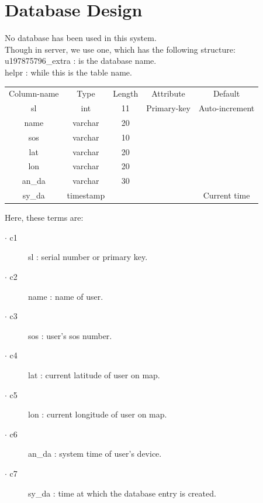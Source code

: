 \newpage
\section{Database Design}
\label{sec:sec02}

No database has been used in this system.\\
Though in server, we use one, which has the following structure: \\
u197875796\_extra : is the database name.\\
helpr : while this is the table name.\\


\begin{center}
\begin{tabular}{ c c c c c }
  
Column-name & Type & Length & Attribute & Default\\
sl & int & 11 & Primary-key & Auto-increment\\
name & varchar & 20\\
sos & varchar & 10\\
lat & varchar & 20\\
lon & varchar & 20\\
an\_da & varchar & 30 \\
sy\_da & timestamp & & & Current time\\
\end{tabular}
\end{center}
\vspace{0.6cm}
Here, these terms are:
\begin{description}
\item[$\cdot$ c1] sl : serial number or primary key.
\item[$\cdot$ c2] name : name of user.
\item[$\cdot$ c3] sos : user's sos number.
\item[$\cdot$ c4] lat : current latitude of user on map.
\item[$\cdot$ c5] lon : current longitude of user on map.
\item[$\cdot$ c6] an\_da : system time of user's device.
\item[$\cdot$ c7] sy\_da : time at which the database entry is created.
\end{description}



